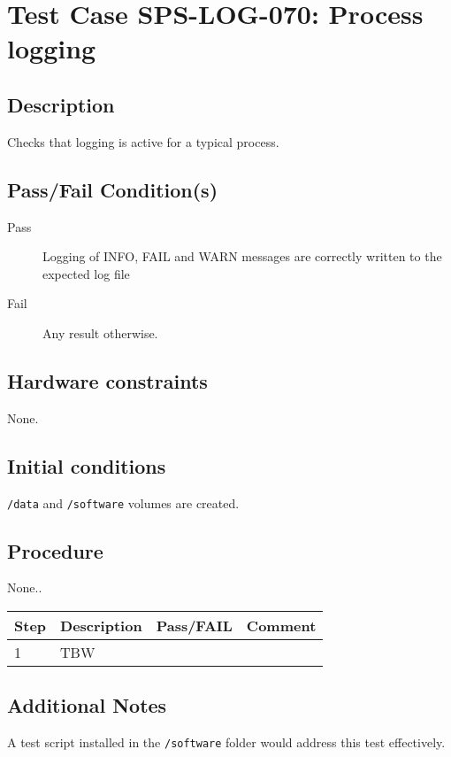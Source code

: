 \section{Test Case SPS-LOG-070: Process logging}

\subsection{Description}

Checks that logging is active for a typical process.

\subsection{Pass/Fail Condition(s)}

\begin{description}
\item [Pass] Logging of INFO, FAIL and WARN messages are correctly written to the expected log file
\item [Fail] Any result otherwise. 
\end{description}

\subsection{Hardware constraints}

None.

\subsection{Initial conditions}

\texttt{/data} and \texttt{/software} volumes are created.

\subsection{Procedure}

None..

\begin{table}[H]
    \begin{tabular}{|l| p{5cm} |l| p{5cm} |}
    \hline
    {\bf Step} & {\bf Description} & {\bf Pass/FAIL} & {\bf Comment}  \\ \hline
    1 & TBW &  &  \\ \hline
    \end{tabular}
\end{table}

\subsection{Additional Notes}

A test script installed in the \texttt{/software} folder would address this test effectively.

